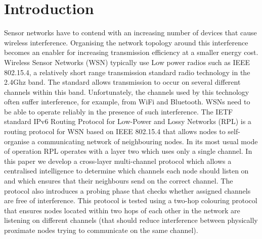 \section{Introduction}
\label{sec:introduction}

Sensor networks have to contend with an increasing number of devices that cause wireless interference. Organising the network topology around this interference becomes an enabler for increasing transmission efficiency at a smaller energy cost. Wireless Sensor Networks (WSN) typically use Low power radios such as IEEE 802.15.4, a relatively short range transmission standard radio technology in the 2.4Ghz band.  The standard allows transmission to occur on several different channels within this band.  Unfortunately, the
channels used by this technology often suffer interference, for example, from WiFi and Bluetooth.  WSNs need to be
able to operate reliably in the presence of such interference.  The IETF standard IPv6 Routing Protocol for Low-Power and Lossy Networks (RPL) is a routing protocol for WSN based on IEEE 802.15.4 that allows nodes to self-organise a communicating network of neighbouring nodes.  In
its most usual mode of operation RPL operates with a layer two which uses only a single channel.  In this paper we develop a cross-layer multi-channel
protocol which allows a centralised intelligence to determine which channels each node should listen on and which ensures that their neighbours send on the correct channel.  The protocol also introduces a probing phase that checks whether assigned channels are free of interference.  This protocol is tested using a two-hop colouring protocol that ensures nodes located within two hops of each other in the network are listening on different channels (that should reduce interference between physically proximate nodes trying to communicate on the same channel).  



